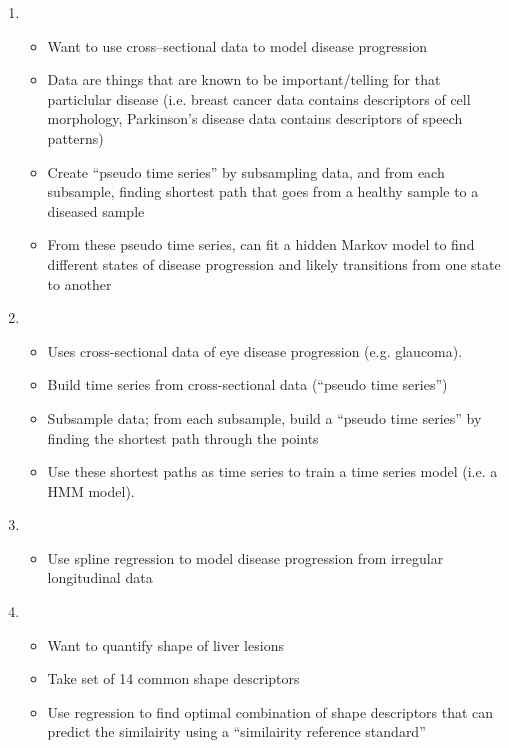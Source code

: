 \documentclass[12pt]{article}
\begin{document}
\begin{enumerate}

\item {}
\begin{itemize}
	\item Want to use cross--sectional data to model disease progression
	\item Data are things that are known to be important/telling for that particlular disease (i.e. breast cancer data contains descriptors of cell morphology, Parkinson's disease data contains descriptors of speech patterns)
	\item Create ``pseudo time series'' by subsampling data, and from each subsample, finding shortest path that goes from a healthy sample to a diseased sample
	\item From these pseudo time series, can fit a hidden Markov model to find different states of disease progression and likely transitions from one state to another
\end{itemize}

\item {}
\begin{itemize}
	\item Uses cross-sectional data of eye disease progression (e.g. glaucoma).
	\item Build time series from cross-sectional data (``pseudo time series'')
	\item Subsample data; from each subsample, build a ``pseudo time series'' by finding the shortest path through the points
	\item Use these shortest paths as time series to train a time series model (i.e. a HMM model).
\end{itemize}

\item {}
\begin{itemize}
	\item Use spline regression to model disease progression from irregular longitudinal data
\end{itemize}

\item {}
\begin{itemize}
	\item Want to quantify shape of liver lesions
	\item Take set of 14 common shape descriptors
	\item Use regression to find optimal combination of shape descriptors that can predict the similairity using a ``similairity reference standard''
\end{itemize}


\end{enumerate}
\end{document}
